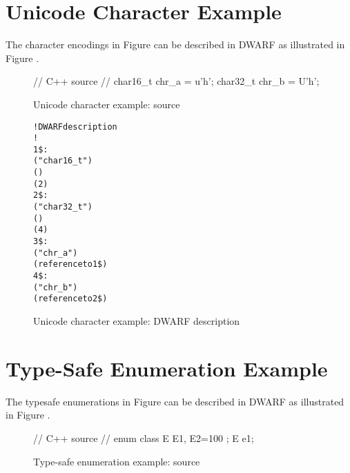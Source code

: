 \clearpage
\section{Unicode Character Example}
\label{app:unicodecharacterexample}
The  character encodings in
Figure 
can be described in DWARF as illustrated in 
Figure .

\begin{figure}[!ht]
\begin{nlnlisting}
// C++ source
//
char16_t chr_a = u'h';
char32_t chr_b = U'h';
\end{nlnlisting}
\caption{Unicode character example: source}
\label{fig:unicodecharacterexamplesource}
\end{figure}

\begin{figure}[ht]
\begin{dwflisting}
\begin{alltt}

! DWARF description
!
1\$: \DWTAGbasetype
        \DWATname("char16\_t")
        \DWATencoding(\DWATEUTF)
        \DWATbytesize(2)
2\$: \DWTAGbasetype
        \DWATname("char32\_t")
        \DWATencoding(\DWATEUTF)
        \DWATbytesize(4)
3\$: \DWTAGvariable
        \DWATname("chr\_a")
        \DWATtype(reference to 1\$)
4\$: \DWTAGvariable
        \DWATname("chr\_b")
        \DWATtype(reference to 2\$)
\end{alltt}
\end{dwflisting}
\caption{Unicode character example: DWARF description}
\label{fig:unicodecharacterexampledwarfdescription}
\end{figure}

\clearpage
\section{Type-Safe Enumeration Example}
\label{app:typesafeenumerationexample}

The  type\dash safe enumerations in
Figure 
can be described in DWARF as illustrated in 
Figure .

\begin{figure}[ht]
\begin{nlnlisting}
// C++ source
//
enum class E { E1, E2=100 };
E e1;
\end{nlnlisting}
\caption{Type-safe enumeration example: source}
\label{fig:ctypesafeenumerationexamplesource}
\end{figure}

